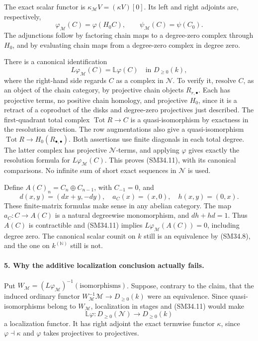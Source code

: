 The exact scalar functor is
\(\kappa_{\mathcal M}V=(\kappa V)[0]\).  Its left and
right adjoints are, respectively,
\[
       \varphi_{\mathcal M}(C)=\varphi(H_0C),\qquad
                     \psi_{\mathcal M}(C)=\psi(C_0).           \tag{SM34.10}
\]
The adjunctions follow by factoring chain maps to a
degree-zero complex through \(H_0\), and by evaluating
chain maps from a degree-zero complex in degree zero.

There is a canonical identification
\[
       L\varphi_{\mathcal M}(C)=\mathbb L\varphi(C)
                                  \quad\text{in }D_{\ge0}(k), \tag{SM34.11}
\]
where the right-hand side regards \(C\) as a complex in
\(\mathcal N\).  To verify it, resolve \(C\), as an
object of the chain category, by projective chain objects
\(R_{r,\bullet}\).  Each has projective terms,
no positive chain homology, and projective \(H_0\), since
it is a retract of a coproduct of the disks and degree-zero
projectives just described.  The first-quadrant total
complex \(\operatorname{Tot}R\to C\) is a quasi-isomorphism
by exactness in the resolution direction.  The row
augmentations also give a quasi-isomorphism
\(\operatorname{Tot}R\to H_0(R_{\bullet,\bullet})\).
Both assertions use finite diagonals in each total degree.
The latter complex has projective \(\mathcal N\)-terms,
and applying \(\varphi\) gives exactly the resolution
formula for \(L\varphi_{\mathcal M}(C)\).  This proves
(SM34.11), with its canonical comparisons.  No infinite
sum of short exact sequences in \(\mathcal N\) is used.

Define \(A(C)_n=C_n\oplus C_{n-1}\), with \(C_{-1}=0\),
and
\[
        d(x,y)=(dx+y,-dy),\quad
        a_C(x)=(x,0),\quad h(x,y)=(0,x).                     \tag{SM34.12}
\]
These finite-matrix formulas make sense in any abelian
category.  The map \(a_C:C\to A(C)\) is a natural
degreewise monomorphism, and \(dh+hd=1\).
Thus \(A(C)\) is contractible and (SM34.11) implies
\(L\varphi_{\mathcal M}(A(C))=0\), including degree zero.
The canonical scalar counit on \(k\) still is an
equivalence by (SM34.8), and the one on
\(k^{(\mathbb N)}\) still is not.

\paragraph{5. Why the additive localization conclusion actually fails.}
Put \(W_{\mathcal M}=(L\varphi_{\mathcal M})^{-1}
(\text{isomorphisms})\).  Suppose, contrary to the claim,
that the induced ordinary functor
\(W_{\mathcal M}^{-1}\mathcal M\to D_{\ge0}(k)\)
were an equivalence.  Since quasi-isomorphisms belong to
\(W_{\mathcal M}\), localization in stages and (SM34.11)
would make
\[
          \mathbb L\varphi:D_{\ge0}(\mathcal N)
                                         \longrightarrow D_{\ge0}(k)
\]
a localization functor.  It has right adjoint the exact
termwise functor \(\kappa\), since
\(\varphi\dashv\kappa\) and \(\varphi\) takes
projectives to projectives.

